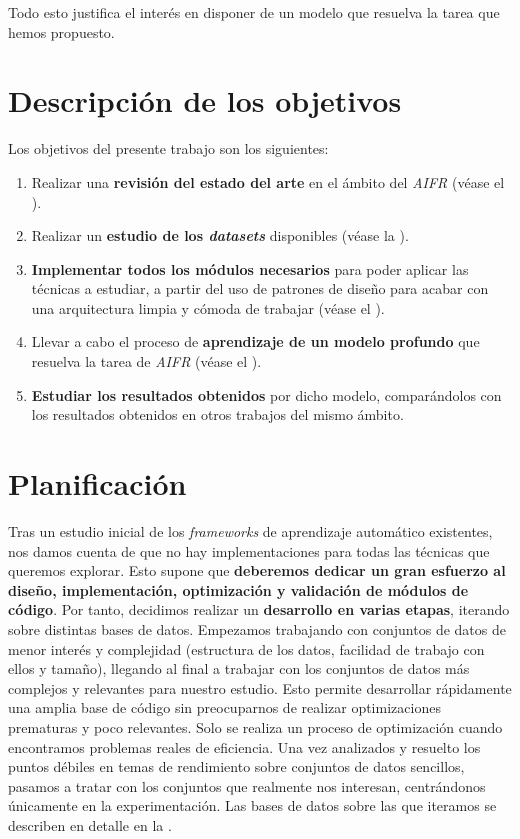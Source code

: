 Todo esto justifica el interés en disponer de un modelo que resuelva la tarea que hemos propuesto.

\section{Descripción de los objetivos}

Los objetivos del presente trabajo son los siguientes:

\begin{enumerate}
	\item Realizar una \textbf{revisión del estado del arte} en el ámbito del \textit{AIFR} (véase el ).
	\item Realizar un \textbf{estudio de los \textit{datasets}} disponibles (véase la ).
	\item \textbf{Implementar todos los módulos necesarios} para poder aplicar las técnicas a estudiar, a partir del uso de patrones de diseño para acabar con una arquitectura limpia y cómoda de trabajar (véase el ).
	\item Llevar a cabo el proceso de \textbf{aprendizaje de un modelo profundo} que resuelva la tarea de \textit{AIFR} (véase el ).
	\item \textbf{Estudiar los resultados obtenidos} por dicho modelo, comparándolos con los resultados obtenidos en otros trabajos del mismo ámbito.
\end{enumerate}

\section{Planificación} \label{isec:planificacion}

Tras un estudio inicial de los \textit{frameworks} de aprendizaje automático existentes, nos damos cuenta de que no hay implementaciones para todas las técnicas que queremos explorar. Esto supone que \textbf{deberemos dedicar un gran esfuerzo al diseño, implementación, optimización y validación de módulos de código}. Por tanto, decidimos realizar un \textbf{desarrollo en varias etapas}, iterando sobre distintas bases de datos. Empezamos trabajando con conjuntos de datos de menor interés y complejidad (estructura de los datos, facilidad de trabajo con ellos y tamaño), llegando al final a trabajar con los conjuntos de datos más complejos y relevantes para nuestro estudio. Esto permite desarrollar rápidamente una amplia base de código sin preocuparnos de realizar optimizaciones prematuras y poco relevantes. Solo se realiza un proceso de optimización cuando encontramos problemas reales de eficiencia. Una vez analizados y resuelto los puntos débiles en temas de rendimiento sobre conjuntos de datos sencillos, pasamos a tratar con los conjuntos que realmente nos interesan, centrándonos únicamente en la experimentación. Las bases de datos sobre las que iteramos se describen en detalle en la .

